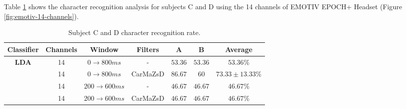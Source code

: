 Table \ref{tab:subject-C-D-char-reco} shows the character recognition analysis for subjects C and D using the 14 channels of EMOTIV EPOCH+ Headset (Figure \ref{fig:emotiv-14-channels}).\par
\begin{table}[!ht]
    \centering
    \begin{tabular}{ c | c | c | c | c | c || c}
        \hline
        \textbf{Classifier} & \textbf{Channels} & \textbf{Window} & \textbf{Filters} & \textbf{A} & \textbf{B} & \textbf{Average} \\
        \hline\hline
        \multirow{4}{*}{\textbf{LDA}} & 14 & $0 \to 800ms$ & - & $53.36$ & $53.36$ & $53.36$\%\\
        {} & 14 & $0 \to 800ms$ & CarMaZsD & $86.67$ & $60$ & $73.33\pm13.33$\%\\
        {} & 14 & $200 \to 600ms$ & - & $46.67$ & $46.67$ & $46.67$\%\\
        {} & 14 & $200 \to 600ms$ & CarMaZsD & $46.67$ & $46.67$ & $46.67$\%\\
        \hline
    \end{tabular}
    \caption{Subject C and D character recognition rate.}
    \label{tab:subject-C-D-char-reco}
\end{table}
\clearpage
